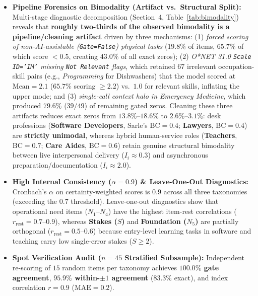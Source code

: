 \documentclass[9pt,letterpaper]{extarticle}
\begin{document}
{\begin{minipage}{\dimexpr\textwidth-2\fboxsep-2\fboxrule\relax}
\begin{itemize}[leftmargin=1.3em,itemsep=1.0pt,topsep=1.5pt,parsep=0pt]
    \item \textbf{Pipeline Forensics on Bimodality (Artifact vs.\ Structural Split):} Multi-stage diagnostic decomposition (Section~4, Table~\ref{tab:bimodality}) reveals that \textbf{roughly two-thirds of the observed bimodality is a pipeline/cleaning artifact} driven by three mechanisms: (1) \emph{forced scoring of non-AI-assistable (\texttt{Gate=False}) physical tasks} ($19.8\%$ of items, $65.7\%$ of which score $<0.5$, creating $43.0\%$ of all exact zeros); (2) \emph{O*NET 31.0 \texttt{Scale ID='IM'} missing \texttt{Not Relevant} flags}, which retained $67$ irrelevant occupation-skill pairs (e.g., \emph{Programming} for Dishwashers) that the model scored at $\text{Mean}=2.1$ ($65.7\%$ scoring $\ge 2.2$) vs.\ $1.0$ for relevant skills, inflating the upper mode; and (3) \emph{single-call context halo in Emergency Medicine}, which produced $79.6\%$ ($39/49$) of remaining gated zeros. Cleaning these three artifacts reduces exact zeros from $13.8\%\text{--}18.6\%$ to \textbf{$2.6\%\text{--}3.1\%$}: desk professions (\textbf{Software Developers}, Sarle's $\text{BC}=0.4$; \textbf{Lawyers}, $\text{BC}=0.4$) are \textbf{strictly unimodal}, whereas hybrid human-service roles (\textbf{Teachers}, $\text{BC}=0.7$; \textbf{Care Aides}, $\text{BC}=0.6$) retain genuine structural bimodality between live interpersonal delivery ($I_i \approx 0.3$) and asynchronous preparation/documentation ($I_i \approx 2.0$).
    \item \textbf{High Internal Consistency ($\alpha = 0.9$) \& Leave-One-Out Diagnostics:} Cronbach's $\alpha$ on certainty-weighted scores is \textbf{$0.9$} across all three taxonomies (exceeding the $0.7$ threshold). Leave-one-out diagnostics show that operational need items ($N_1\text{--}N_4$) have the highest item-rest correlations ($r_{\text{rest}}=0.7\text{--}0.9$), whereas \textbf{Stakes ($S$)} and \textbf{Foundation ($N_5$)} are partially orthogonal ($r_{\text{rest}}=0.5\text{--}0.6$) because entry-level learning tasks in software and teaching carry low single-error stakes ($S \ge 2$).
    \item \textbf{Spot Verification Audit ($n=45$ Stratified Subsample):} Independent re-scoring of $15$ random items per taxonomy achieves \textbf{$100.0\%$ gate agreement}, \textbf{$95.9\%$ within-$\pm 1$ agreement} ($83.3\%$ exact), and index correlation \textbf{$r=0.9$} ($\text{MAE}=0.2$).
\end{itemize}
\vspace{1pt}
\end{minipage}%
}
\end{document}
